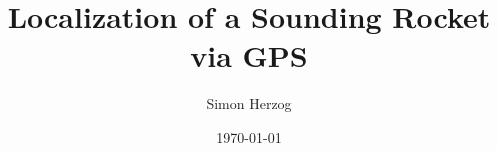 \documentclass[    
    paper=a4,
    twoside=false,
    12pt,
    pagesize=auto,
    parskip=half,
    headsepline=true,
    numbers=noenddot, %
    draft=false
]{report}
\title{Localization of a Sounding Rocket via GPS}
\author{Simon Herzog}
\date{\today}
\begin{document}
 
 \setcounter{page}{1}
 
  

 
 
 
 
 \tableofcontents
 
 
 
 \newpage
 
 \setcounter{page}{1}

 

 
 
 
 
 
 
 
 
 
 
 
 
 
 
 \begin{appendices}
  
  
  
 \end{appendices}
 
\end{document}
